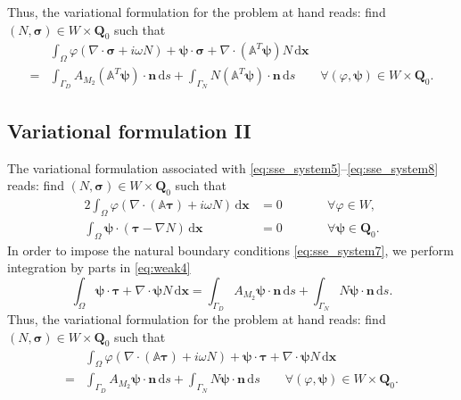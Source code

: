 \documentclass[11pt,a4paper]{article}
\begin{document}
Thus, the variational formulation for the problem at hand reads: find $(N,\boldsymbol{\sigma})\in W\times\mathbf{Q}_0$ such that
\begin{align}
&\int_\Omega\varphi\left(\nabla\cdot\boldsymbol{\sigma}+i\omega N\right)+\boldsymbol{\psi}\cdot\boldsymbol{\sigma}+\nabla\cdot(\mathbb{A}^T\boldsymbol{\psi})N\,\mathrm{d}\mathbf{x}\\
=&\int_{\Gamma_D} A_{M_2}(\mathbb{A}^T\boldsymbol{\psi})\cdot\mathbf{n}\,\mathrm{d}s+\int_{\Gamma_N} N(\mathbb{A}^T\boldsymbol{\psi})\cdot\mathbf{n}\,\mathrm{d}s \qquad \forall (\varphi,\boldsymbol{\psi})\in W\times\mathbf{Q}_0.
\end{align}

\subsection{Variational formulation II}
The variational formulation associated with \eqref{eq:sse_system5}--\eqref{eq:sse_system8} reads: find $(N,\boldsymbol{\sigma})\in W\times\mathbf{Q}_0$ such that 
\begin{alignat}{2}
\int_\Omega\varphi\left(\nabla\cdot(\mathbb{A}\boldsymbol{\tau})+i\omega N\right)\,\mathrm{d}\mathbf{x}&=0 \qquad && \forall \varphi\in W,
\label{eq:weak3}\\
\int_\Omega\boldsymbol{\psi}\cdot\left(\boldsymbol{\tau}-\nabla N\right)\,\mathrm{d}\mathbf{x}&=0 \qquad && \forall \boldsymbol{\psi}\in \mathbf{Q}_0.
\label{eq:weak4}
\end{alignat}
In order to impose the natural boundary conditions \eqref{eq:sse_system7}, we perform integration by parts in \eqref{eq:weak4} 
\begin{equation}
\int_\Omega\boldsymbol{\psi}\cdot\boldsymbol{\tau}+
\nabla\cdot\boldsymbol{\psi}N\,\mathrm{d}\mathbf{x}=
\int_{\Gamma_D}A_{M_2}\boldsymbol{\psi}\cdot\mathbf{n}\,\mathrm{d}s+
\int_{\Gamma_N}N\boldsymbol{\psi}\cdot\mathbf{n}\,\mathrm{d}s.
\end{equation}
Thus, the variational formulation for the problem at hand reads: find $(N,\boldsymbol{\sigma})\in W\times\mathbf{Q}_0$ such that
\begin{align}
&\int_\Omega\varphi\left(\nabla\cdot(\mathbb{A}\boldsymbol{\tau})+i\omega N\right)+\boldsymbol{\psi}\cdot\boldsymbol{\tau}+\nabla\cdot\boldsymbol{\psi}N\,\mathrm{d}\mathbf{x}\\
=& \int_{\Gamma_D}A_{M_2}\boldsymbol{\psi}\cdot\mathbf{n}\,\mathrm{d}s+
\int_{\Gamma_N}N\boldsymbol{\psi}\cdot\mathbf{n}\,\mathrm{d}s
\qquad \forall (\varphi,\boldsymbol{\psi})\in W\times\mathbf{Q}_0.
\end{align}
\end{document}
